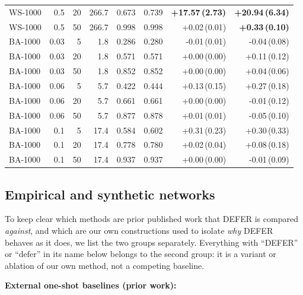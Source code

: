 \documentclass[11pt]{article}
\theoremstyle{definition}
\theoremstyle{remark}
\begin{document}
\begin{table}[h]
\begin{tabular}{lrrrrrrr}
WS-1000 & 0.5 & 20 & 266.7 & 0.673 & 0.739 & \textbf{+17.57\,(2.73)} & \textbf{+20.94\,(6.34)} \\
WS-1000 & 0.5 & 50 & 266.7 & 0.998 & 0.998 & +0.02\,(0.01) & \textbf{+0.33\,(0.10)} \\
BA-1000 & 0.03 & 5 & 1.8 & 0.286 & 0.280 & -0.01\,(0.01) & -0.04\,(0.08) \\
BA-1000 & 0.03 & 20 & 1.8 & 0.571 & 0.571 & +0.00\,(0.00) & +0.11\,(0.12) \\
BA-1000 & 0.03 & 50 & 1.8 & 0.852 & 0.852 & +0.00\,(0.00) & +0.04\,(0.06) \\
BA-1000 & 0.06 & 5 & 5.7 & 0.422 & 0.444 & +0.13\,(0.15) & +0.27\,(0.18) \\
BA-1000 & 0.06 & 20 & 5.7 & 0.661 & 0.661 & +0.00\,(0.00) & -0.01\,(0.12) \\
BA-1000 & 0.06 & 50 & 5.7 & 0.877 & 0.878 & +0.01\,(0.01) & -0.05\,(0.10) \\
BA-1000 & 0.1 & 5 & 17.4 & 0.584 & 0.602 & +0.31\,(0.23) & +0.30\,(0.33) \\
BA-1000 & 0.1 & 20 & 17.4 & 0.778 & 0.780 & +0.02\,(0.04) & +0.08\,(0.18) \\
BA-1000 & 0.1 & 50 & 17.4 & 0.937 & 0.937 & +0.00\,(0.00) & -0.01\,(0.09) \\
\hline
\end{tabular}
\end{table}

\subsection{Empirical and synthetic networks}\label{sec:defer-experiments}

To keep clear which methods are prior published work that DEFER is
compared \emph{against}, and which are our own constructions used to
isolate \emph{why} DEFER behaves as it does, we list the two groups
separately. Everything with ``DEFER'' or ``defer'' in its name below
belongs to the second group: it is a variant or ablation of our own
method, not a competing baseline.

\noindent\textbf{External one-shot baselines (prior work):}
\end{document}
